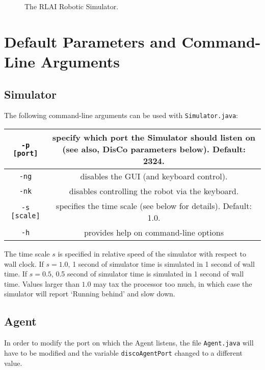 \documentclass[12pt]{article}
\begin{document}
\begin{figure}
\centerline{
}
\caption{The RLAI Robotic Simulator.}
\end{figure}

\section{Default Parameters and Command-Line Arguments\label{sec:changingDefaults}}

\subsection{Simulator}

The following command-line arguments can be used with \verb+Simulator.java+:

\begin{center}
\begin{tabular}{|c|c|}
\hline
\verb+-p [port]+ & specify which port the Simulator should listen on (see also, DisCo parameters below). Default: 2324. \\
\hline
\verb+-ng+ & disables the GUI (and keyboard control). \\
\hline
\verb+-nk+ & disables controlling the robot via the keyboard. \\
\hline
\verb+-s [scale]+ & specifies the time scale (see below for details). Default: 1.0. \\
\hline
\verb+-h+ & provides help on command-line options \\ 
\hline
\end{tabular}
\end{center}

The time scale $s$ is specified in relative speed of the simulator with respect 
to wall clock. If $s=1.0$, 1 second of simulator time is simulated in 1 second
of wall time. If $s=0.5$, 0.5 second of simulator time is simulated in 1
second of wall time. Values larger than $1.0$ may tax the processor too much,
in which case the simulator will report `Running behind' and slow down.

\subsection{Agent}

In order to modify the port on which the Agent listens, the file 
\verb+Agent.java+ will have to be modified and the variable \verb+discoAgentPort+ changed to a different value.
\end{document}
